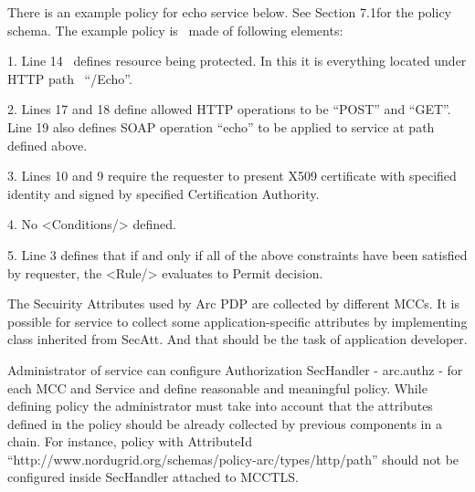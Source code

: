 \documentclass{article}
\begin{document}
{\upshape\color{black}
There is an example policy for echo service below. See Section 7.1for
the policy schema. The example policy is \ made of following elements:
}

{\color{black}
1. Line 14 \ defines resource being protected. In this it is everything
located under HTTP path
\ {\textquotedblleft}/Echo{\textquotedblright}.}

{\color{black}
2. Lines 17 and 18 define allowed HTTP operations to be
{\textquotedblleft}POST{\textquotedblright} and
{\textquotedblleft}GET{\textquotedblright}. Line 19 also defines SOAP
operation {\textquotedblleft}echo{\textquotedblright} to be applied to
service at path defined above.}

{\color{black}
3. Lines 10 and 9 require the requester to present X509 certificate with
specified identity and signed by specified Certification Authority.}

{\color{black}
4. No {\textless}Conditions/{\textgreater} defined.}

{\color{black}
5. Line 3 defines that if and only if all of the above constraints have
been satisfied by requester, the {\textless}Rule/{\textgreater}
evaluates to Permit decision.}

{\color{black}
The Secuirity Attributes used by Arc PDP are collected by different
MCCs. It is possible for service to collect some application-specific
attributes by implementing class inherited from SecAtt. And that should
be the task of application developer.}

{\upshape\color{black}
Administrator of service can configure Authorization SecHandler -
arc.authz - for each MCC and Service and define reasonable and
meaningful policy. While defining policy the administrator must take
into account that the attributes defined in the policy should be
already collected by previous components in a chain. For instance,
policy with AttributeId
{\textquotedblleft}http://www.nordugrid.org/schemas/policy-arc/types/http/path{\textquotedblright}
should not be configured inside SecHandler attached to MCCTLS. }
\end{document}
